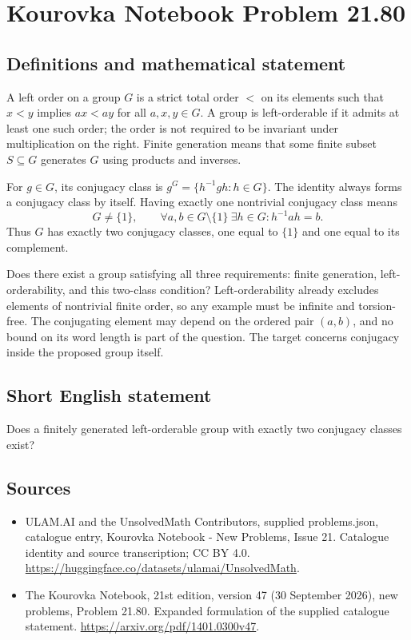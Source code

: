 \documentclass[11pt,a4paper]{article}
\begin{document}
\section*{Kourovka Notebook Problem 21.80}\label{statement}

\subsection{Definitions and mathematical statement}
A left order on a group $G$ is a strict total order $<$ on its elements such that $x<y$ implies $ax<ay$ for all $a,x,y\in G$. A group is left-orderable if it admits at least one such order; the order is not required to be invariant under multiplication on the right. Finite generation means that some finite subset $S\subseteq G$ generates $G$ using products and inverses.

For $g\in G$, its conjugacy class is $g^G=\{h^{-1}gh:h\in G\}$. The identity always forms a conjugacy class by itself. Having exactly one nontrivial conjugacy class means
\[
 G\ne\{1\},\qquad
 \forall a,b\in G\setminus\{1\}\ \exists h\in G:
 h^{-1}ah=b.
\]
Thus $G$ has exactly two conjugacy classes, one equal to $\{1\}$ and one equal to its complement.

Does there exist a group satisfying all three requirements: finite generation, left-orderability, and this two-class condition? Left-orderability already excludes elements of nontrivial finite order, so any example must be infinite and torsion-free. The conjugating element may depend on the ordered pair $(a,b)$, and no bound on its word length is part of the question. The target concerns conjugacy inside the proposed group itself.
\subsection{Short English statement}
Does a finitely generated left-orderable group with exactly two conjugacy classes exist?
\subsection{Sources}
\begin{itemize}
\item[S1] ULAM.AI and the UnsolvedMath Contributors, supplied problems.json, catalogue entry, Kourovka Notebook - New Problems, Issue 21. Catalogue identity and source transcription; CC BY 4.0.
\url{https://huggingface.co/datasets/ulamai/UnsolvedMath}.
\item[S2] The Kourovka Notebook, 21st edition, version 47 (30 September 2026), new problems, Problem 21.80. Expanded formulation of the supplied catalogue statement.
\url{https://arxiv.org/pdf/1401.0300v47}.
\end{itemize}
\end{document}
